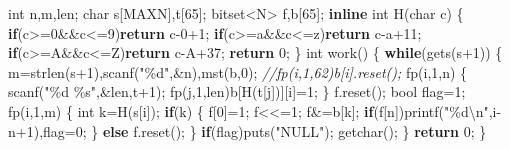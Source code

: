 \documentclass[
]{article}
\newenvironment{Shaded}{}{}
\newcommand{\CharTok}[1]{\textcolor[rgb]{0.25,0.44,0.63}{#1}}
\newcommand{\CommentTok}[1]{\textcolor[rgb]{0.38,0.63,0.69}{\textit{#1}}}
\newcommand{\ControlFlowTok}[1]{\textcolor[rgb]{0.00,0.44,0.13}{\textbf{#1}}}
\newcommand{\DataTypeTok}[1]{\textcolor[rgb]{0.56,0.13,0.00}{#1}}
\newcommand{\DecValTok}[1]{\textcolor[rgb]{0.25,0.63,0.44}{#1}}
\newcommand{\KeywordTok}[1]{\textcolor[rgb]{0.00,0.44,0.13}{\textbf{#1}}}
\newcommand{\NormalTok}[1]{#1}
\newcommand{\SpecialCharTok}[1]{\textcolor[rgb]{0.25,0.44,0.63}{#1}}
\newcommand{\StringTok}[1]{\textcolor[rgb]{0.25,0.44,0.63}{#1}}
\begin{document}
\begin{Shaded}
\begin{Highlighting}[]
\DataTypeTok{int}\NormalTok{ n,m,len;}
\DataTypeTok{char}\NormalTok{ s[MAXN],t[}\DecValTok{65}\NormalTok{];}
\NormalTok{bitset\textless{}N\textgreater{} f,b[}\DecValTok{65}\NormalTok{];}
\KeywordTok{inline} \DataTypeTok{int}\NormalTok{ H(}\DataTypeTok{char}\NormalTok{ c)}
\NormalTok{\{}
    \ControlFlowTok{if}\NormalTok{(c\textgreater{}=}\CharTok{\textquotesingle{}0\textquotesingle{}}\NormalTok{\&\&c\textless{}=}\CharTok{\textquotesingle{}9\textquotesingle{}}\NormalTok{)}\ControlFlowTok{return}\NormalTok{ c{-}}\CharTok{\textquotesingle{}0\textquotesingle{}}\NormalTok{+}\DecValTok{1}\NormalTok{;}
    \ControlFlowTok{if}\NormalTok{(c\textgreater{}=}\CharTok{\textquotesingle{}a\textquotesingle{}}\NormalTok{\&\&c\textless{}=}\CharTok{\textquotesingle{}z\textquotesingle{}}\NormalTok{)}\ControlFlowTok{return}\NormalTok{ c{-}}\CharTok{\textquotesingle{}a\textquotesingle{}}\NormalTok{+}\DecValTok{11}\NormalTok{;}
    \ControlFlowTok{if}\NormalTok{(c\textgreater{}=}\CharTok{\textquotesingle{}A\textquotesingle{}}\NormalTok{\&\&c\textless{}=}\CharTok{\textquotesingle{}Z\textquotesingle{}}\NormalTok{)}\ControlFlowTok{return}\NormalTok{ c{-}}\CharTok{\textquotesingle{}A\textquotesingle{}}\NormalTok{+}\DecValTok{37}\NormalTok{;}
    \ControlFlowTok{return} \DecValTok{0}\NormalTok{;}
\NormalTok{\}}
\DataTypeTok{int}\NormalTok{ work()}
\NormalTok{\{}
    \ControlFlowTok{while}\NormalTok{(gets(s+}\DecValTok{1}\NormalTok{))}
\NormalTok{    \{}
\NormalTok{        m=strlen(s+}\DecValTok{1}\NormalTok{),scanf(}\StringTok{"}\SpecialCharTok{\%d}\StringTok{"}\NormalTok{,\&n),mst(b,}\DecValTok{0}\NormalTok{);}
        \CommentTok{//fp(i,1,62)b[i].reset();}
\NormalTok{        fp(i,}\DecValTok{1}\NormalTok{,n)}
\NormalTok{        \{}
\NormalTok{            scanf(}\StringTok{"}\SpecialCharTok{\%d}\StringTok{ }\SpecialCharTok{\%s}\StringTok{"}\NormalTok{,\&len,t+}\DecValTok{1}\NormalTok{);}
\NormalTok{            fp(j,}\DecValTok{1}\NormalTok{,len)b[H(t[j])][i]=}\DecValTok{1}\NormalTok{;}
\NormalTok{        \}}
\NormalTok{        f.reset(); }\DataTypeTok{bool}\NormalTok{ flag=}\DecValTok{1}\NormalTok{;}
\NormalTok{        fp(i,}\DecValTok{1}\NormalTok{,m)}
\NormalTok{        \{}
            \DataTypeTok{int}\NormalTok{ k=H(s[i]);}
            \ControlFlowTok{if}\NormalTok{(k)}
\NormalTok{            \{}
\NormalTok{                f[}\DecValTok{0}\NormalTok{]=}\DecValTok{1}\NormalTok{;}
\NormalTok{                f\textless{}\textless{}=}\DecValTok{1}\NormalTok{;}
\NormalTok{                f\&=b[k];}
                \ControlFlowTok{if}\NormalTok{(f[n])printf(}\StringTok{"}\SpecialCharTok{\%d\textbackslash{}n}\StringTok{"}\NormalTok{,i{-}n+}\DecValTok{1}\NormalTok{),flag=}\DecValTok{0}\NormalTok{;}
\NormalTok{            \}}
            \ControlFlowTok{else}\NormalTok{ f.reset();}
\NormalTok{        \}}
        \ControlFlowTok{if}\NormalTok{(flag)puts(}\StringTok{"NULL"}\NormalTok{); getchar();}
\NormalTok{    \}}
    \ControlFlowTok{return} \DecValTok{0}\NormalTok{;}
\NormalTok{\}}
\end{Highlighting}
\end{Shaded}
\end{document}
